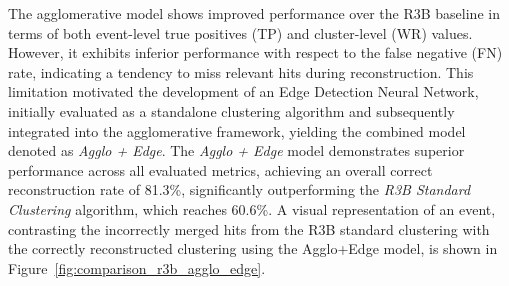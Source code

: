\documentclass[final,5p,times,twocolumn]{elsarticle}
\begin{document}
The agglomerative model shows improved performance over the R3B baseline in terms of both event-level true positives (TP) and cluster-level (WR) values. However, it exhibits inferior performance with respect to the false negative (FN) rate, indicating a tendency to miss relevant hits during reconstruction. This limitation motivated the development of an Edge Detection Neural Network, initially evaluated as a standalone clustering algorithm and subsequently integrated into the agglomerative framework, yielding the combined model denoted as \textit{Agglo + Edge}.\newline
The \textit{Agglo + Edge} model demonstrates superior performance across all evaluated metrics, achieving an overall correct reconstruction rate of 81.3\%, significantly outperforming the \textit{R3B Standard Clustering} algorithm, which reaches 60.6\%.\newline
A visual representation of an event, contrasting the incorrectly merged hits from the R3B standard clustering with the correctly reconstructed clustering using the Agglo+Edge model, is shown in Figure~\ref{fig:comparison_r3b_agglo_edge}.\newline
\end{document}
